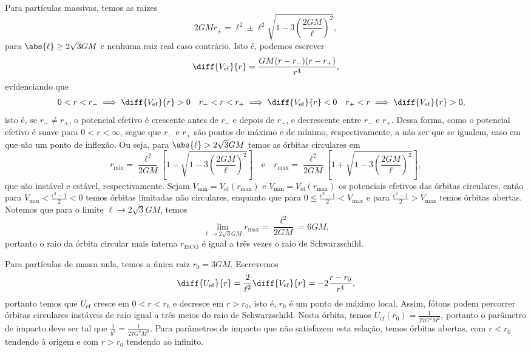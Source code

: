 Para partículas massivas, temos as raízes
\begin{equation*}
    2GM r_{\pm} = \ell^2 \pm \ell^2\sqrt{1 - 3 \left(\frac{2GM}{\ell}\right)^2},
\end{equation*}
para \(\abs{\ell} \geq 2\sqrt{3} GM\) e nenhuma raiz real caso contrário. Isto é, podemos escrever
\begin{equation*}
    \diff{V_\mathrm{ef}}{r} = \frac{GM (r - r_-)(r-r_+)}{r^4},
\end{equation*}
evidenciando que
\begin{align*}
    0 < r < r_- &\implies \diff{V_\mathrm{ef}}{r} > 0& r_- < r < r_+ &\implies \diff{V_\mathrm{ef}}{r} < 0 & r_+ < r &\implies \diff{V_\mathrm{ef}}{r} > 0,
\end{align*}
isto é, se \(r_- \neq r_+\), o potencial efetivo é crescente antes de \(r_-\) e depois de \(r_+\), e decrescente entre \(r_-\) e \(r_+\). Dessa forma, como o potencial efetivo é suave para \(0 < r < \infty\), segue que \(r_-\) e \(r_+\) são pontos de máximo e de mínimo, respectivamente, a não ser que se igualem, caso em que são um ponto de inflexão. Ou seja, para \(\abs{\ell} > 2\sqrt{3}GM\) temos as órbitas circulares em
\begin{equation*}
    r_\mathrm{min} = \frac{\ell^2}{2GM}\left[1 - \sqrt{1 - 3\left(\frac{2GM}{\ell}\right)^2}\right]\quad\text{e}\quad
    r_\mathrm{max} = \frac{\ell^2}{2GM}\left[1 + \sqrt{1 - 3\left(\frac{2GM}{\ell}\right)^2}\right],
\end{equation*}
que são instável e estável, respectivamente. Sejam \(V_\mathrm{min} = V_\mathrm{ef}(r_\mathrm{max})\) e \(V_\mathrm{min} = V_\mathrm{ef}(r_\mathrm{max})\) os potenciais efetivos das órbitas circulares, então para \(V_\mathrm{min} < \frac{\epsilon^2 - 1}{2} < 0\) temos órbitas limitadas não circulares, enquanto que para \(0 \leq \frac{\epsilon^2 - 1}{2} < V_\mathrm{max}\) e para \(\frac{\epsilon^2 - 1}{2} > V_\mathrm{max}\) temos órbitas abertas. Notemos que para o limite \(\ell \to 2\sqrt{3}GM\), temos
\begin{equation*}
    \lim_{\ell \to 2\sqrt{3}GM} r_\mathrm{max} = \frac{\ell^2}{2GM} = 6GM,
\end{equation*}
portanto o raio da órbita circular mais interna \(r_\mathrm{ISCO}\) é igual a três vezes o raio de Schwarzschild.

Para partículas de massa nula, temos a única raiz \(r_0 = 3GM\). Escrevemos
\begin{equation*}
    \diff{U_\mathrm{ef}}{r} = \frac{2}{\ell^2}\diff{V_\mathrm{ef}}{r} = -2\frac{r - r_0}{r^4},
\end{equation*}
portanto temos que \(U_\mathrm{ef}\) cresce em \(0 < r < r_0\) e decresce em \(r > r_0\), isto é, \(r_0\) é um ponto de máximo local. Assim, fótons podem percorrer órbitas circulares instáveis de raio igual a três meios do raio de Schwarzschild. Nesta órbita, temos \(U_\mathrm{ef}(r_0) = \frac{1}{27 G^2M^2}\), portanto o parâmetro de impacto deve ser tal que \(\frac1{b^2} = \frac{1}{27G^2M^2}\). Para parâmetros de impacto que não satisfazem esta relação, temos órbitas abertas, com \(r < r_0\) tendendo à origem e com \(r > r_0\) tendendo ao infinito.


